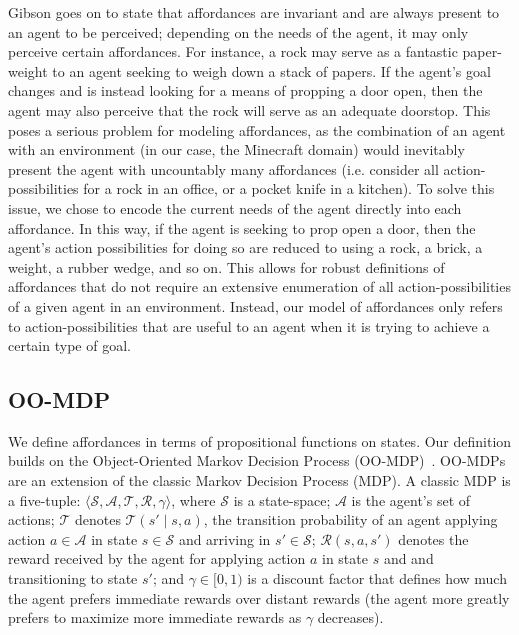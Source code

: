 \documentclass[]{article}
\begin{document}
Gibson goes on to state that affordances are invariant and are always present to an agent to be perceived; depending on the needs of the agent, it may only perceive certain affordances. For instance, a rock may serve as a fantastic paper-weight to an agent seeking to weigh down a stack of papers. If the agent's goal changes and is instead looking for a means of propping a door open, then the agent may also perceive that the rock will serve as an adequate doorstop. This poses a serious problem for modeling affordances, as the combination of an agent with an environment (in our case, the Minecraft domain) would inevitably present the agent with uncountably many affordances (i.e. consider all action-possibilities  for a rock in an office, or a pocket knife in a kitchen). To solve this issue, we chose to encode the current needs of the agent directly into each affordance. In this way, if the agent is seeking to prop open a door, then the agent's action possibilities for doing so are reduced to using a rock, a brick, a weight, a rubber wedge, and so on. This allows for robust definitions of affordances that do not require an extensive enumeration of all action-possibilities of a given agent in an environment. Instead, our model of affordances only refers to action-possibilities that are useful to an agent when it is trying to achieve a certain type of goal.


\subsection{OO-MDP}

We define affordances in terms of propositional functions on states. Our definition builds on the Object-Oriented Markov Decision Process
(OO-MDP)~\citep{diuk08}.  OO-MDPs are an extension of
the classic Markov Decision Process (MDP).  A classic MDP is a
five-tuple: $\langle \mathcal{S}, \mathcal{A}, \mathcal{T},
\mathcal{R}, \gamma \rangle$, where $\mathcal{S}$ is a state-space;
$\mathcal{A}$ is the agent's set of actions; $\mathcal{T}$ denotes
$\mathcal{T}(s' \mid s,a)$, the transition probability of an agent
applying action $a \in \mathcal{A}$ in state $s \in \mathcal{S}$ and
arriving in $s' \in \mathcal{S}$; $\mathcal{R}(s,a,s')$ denotes the
reward received by the agent for applying action $a$ in state $s$ and
and transitioning to state $s'$; and $\gamma \in [0, 1)$ is a discount
  factor that defines how much the agent prefers immediate rewards
  over distant rewards (the agent more greatly prefers to maximize
  more immediate rewards as $\gamma$ decreases).
\end{document}
